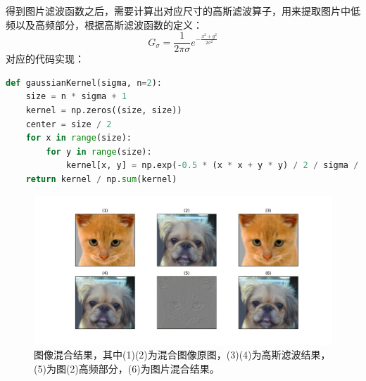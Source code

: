 \documentclass{article}
\begin{document}
得到图片滤波函数之后，需要计算出对应尺寸的高斯滤波算子，用来提取图片中低频以及高频部分，根据高斯滤波函数的定义：
\begin{equation}
    G_\sigma = \frac{1}{2\pi \sigma}e^{-\frac{x^2+y^2}{2\sigma ^2}}
\end{equation}
对应的代码实现：
\begin{lstlisting}[language=Python, frame=shadowbox]
def gaussianKernel(sigma, n=2):
    size = n * sigma + 1
    kernel = np.zeros((size, size))
    center = size / 2
    for x in range(size):
        for y in range(size):
            kernel[x, y] = np.exp(-0.5 * (x * x + y * y) / 2 / sigma / sigma)
    return kernel / np.sum(kernel)
\end{lstlisting}

\begin{figure}[h]
    \centering
    \includegraphics[width=\textwidth]{./project1/img/hybird.pdf}
    \caption{图像混合结果，其中(1)(2)为混合图像原图，(3)(4)为高斯滤波结果，(5)为图(2)高频部分，(6)为图片混合结果。}
\end{figure}
\end{document}
